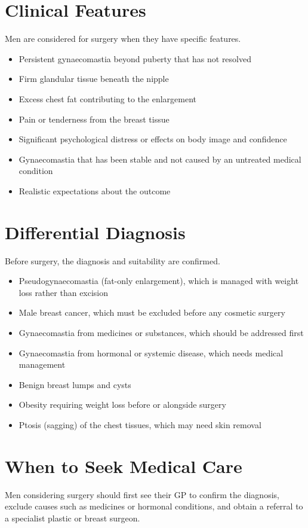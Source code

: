 \section*{Clinical Features}
Men are considered for surgery when they have specific features.

\begin{itemize}
    \item Persistent gynaecomastia beyond puberty that has not resolved
    \item Firm glandular tissue beneath the nipple
    \item Excess chest fat contributing to the enlargement
    \item Pain or tenderness from the breast tissue
    \item Significant psychological distress or effects on body image and confidence
    \item Gynaecomastia that has been stable and not caused by an untreated medical condition
    \item Realistic expectations about the outcome
\end{itemize}

\section*{Differential Diagnosis}
Before surgery, the diagnosis and suitability are confirmed.

\begin{itemize}
    \item Pseudogynaecomastia (fat-only enlargement), which is managed with weight loss rather than excision
    \item Male breast cancer, which must be excluded before any cosmetic surgery
    \item Gynaecomastia from medicines or substances, which should be addressed first
    \item Gynaecomastia from hormonal or systemic disease, which needs medical management
    \item Benign breast lumps and cysts
    \item Obesity requiring weight loss before or alongside surgery
    \item Ptosis (sagging) of the chest tissues, which may need skin removal
\end{itemize}

\section*{When to Seek Medical Care}
Men considering surgery should first see their GP to confirm the diagnosis, exclude causes such as medicines or hormonal conditions, and obtain a referral to a specialist plastic or breast surgeon.

